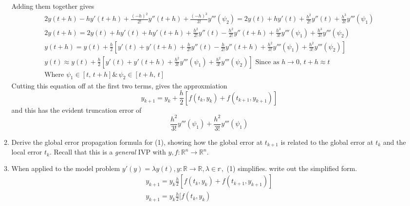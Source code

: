 \documentclass{article}
\begin{document}
\begin{enumerate}
\begin{enumerate}
               Adding them together gives 
               \begin{align*}
               2y(t + h) - hy'(t + h) 
               + \frac{(-h)^2}{2!} y''(t+h) 
               + \frac{(-h)^3}{3!}y'''(\psi_2)
               = 2y(t) + hy'(t) + \frac{h^2}{2!} y''(t) 
               + \frac{h^3}{3!}y'''(\psi_1) \\
               2y(t + h) 
               = 2y(t) + hy'(t) + hy'(t + h) + \frac{h^2}{2!} y''(t) 
               - \frac{h^2}{2!} y''(t+h) 
               + \frac{h^3}{3!}y'''(\psi_1) 
               + \frac{h^3}{3!}y'''(\psi_2) \\
               y(t + h) 
               = y(t) + \frac{h}{2}
               [y'(t) + y'(t + h) + \frac{h}{2!} y''(t) 
               - \frac{h}{2!} y''(t+h) 
               + \frac{h^2}{3!}y'''(\psi_1) 
               + \frac{h^2}{3!}y'''(\psi_2)] \\
               y(t) \approx y(t) + \frac{h}{2}
               [y'(t) + y'(t + h) 
               + \frac{h^2}{3!}y'''(\psi_1) 
               + \frac{h^2}{3!}y'''(\psi_2)] \text{ Since as }
               h \rightarrow 0,\, t + h \approx t\\
               \text{Where } \psi_1 \in [t,\, t+h] \& \,
               \psi_2 \in [t+h ,\, t] 
               \end{align*}
               Cutting this equation off at the first two terms, gives
               the approxmiation
               \[ y_{k+1}
               = y_k + \frac{h}{2}
               [f(t_k, y_k) + f(t_{k+1}, y_{k+1})] \]
               and this has the evident truncation error of 
               \[\frac{h^2}{3!}y'''(\psi_1) + \frac{h^2}{3!}y'''(\psi_1)\]
            \item Derive the global error propagation formula for (1),
                showing how the global error at $t_{k+1}$ is related
                to the global error at $t_k$ and the local error $t_k$.
                Recall that this is a \textit{general} IVP with $y,f:
                \mathbb{R}^n \rightarrow \mathbb{R}^n$.
            \item When applied to the model problem $y'(y) = \lambda y(t),
                y: \mathbb{R} \rightarrow \mathbb{R}, \lambda \in 
                \mathbb{r},$ (1) simplifies. write out the simplified form.
                \begin{align*} y_{k+1} = y_k \frac{h}{2}[f(t_k,y_k) 
                + f(t_{k+1}, y_{k+1})] \\
                y_{k+1} = y_k \frac{h}{2}[f(t_k,y_k) 

\end{align*}
\end{enumerate}
\end{enumerate}
\end{document}
